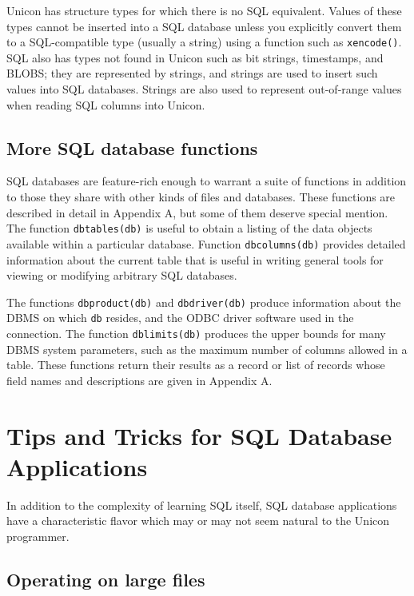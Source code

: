 Unicon has structure types for which there is no SQL equivalent. Values
of these types cannot be inserted into a SQL database unless you
explicitly convert them to a SQL-compatible type (usually a string)
using a function such as \texttt{xencode()}.
SQL also has types not found in Unicon such as bit
strings, timestamps, and BLOBS; they are represented
by strings, and strings are used to insert such values into SQL
databases. Strings are also used to represent out-of-range values when
reading SQL columns into Unicon.

\subsection*{More SQL database functions}

SQL databases are feature-rich enough to warrant a suite
of functions in addition to those they
share with other kinds of files and databases. These functions are
described in detail in Appendix A, but some of them deserve special
mention. The function \texttt{dbtables(db)} is useful to obtain a
listing of the data objects available within a particular database.
Function \texttt{dbcolumns(db)} provides detailed information about the
current table that is useful in writing general tools for viewing or
modifying arbitrary SQL databases.

The functions \texttt{dbproduct(db)} and \texttt{dbdriver(db)} produce
information about the DBMS on which \texttt{db} resides, and the
ODBC driver software used in the connection.
The function \texttt{dblimits(db)} produces the upper bounds for many
DBMS system parameters, such as the maximum number of columns allowed
in a table. These functions return their results as
a record or list of records whose field names and descriptions
are given in Appendix A.

\section{Tips and Tricks for SQL Database Applications}

In addition to the complexity of learning SQL itself, SQL database
applications have a characteristic flavor which may or may not seem
natural to the Unicon programmer.

\subsection*{Operating on large files}

